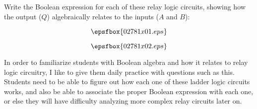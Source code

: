 

Write the Boolean expression for each of these relay logic circuits, showing how the output ($Q$) algebraically relates to the inputs ($A$ and $B$):

$$\epsfbox{02781x01.eps}$$







$$\epsfbox{02781x02.eps}$$







In order to familiarize students with Boolean algebra and how it relates to relay logic circuitry, I like to give them daily practice with questions such as this.  Students need to be able to figure out how each one of these ladder logic circuits works, and also be able to associate the proper Boolean expression with each one, or else they will have difficulty analyzing more complex relay circuits later on.




